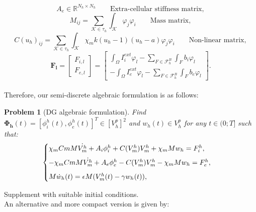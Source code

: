 \documentclass[a4paper,11pt]{article}
\newtheorem{problem}{Problem}
\begin{document}
\begin{equation*}
A_e \in \mathbb{R}^{N_h \times N_h} \qquad{\text{Extra-cellular stiffness matrix}},
\end{equation*}
\begin{equation*}
M_{ij} = \sum_{\mathcal{K} \in \tau_h}\int_{\mathcal{K}}\varphi_j\varphi_i \qquad{\text{Mass matrix}},
\end{equation*}
\begin{equation*}
C(u_h)_{ij} =  \sum_{\mathcal{K} \in \tau_h} \int_{\mathcal{K}} \chi_m k(u_h-1)(u_h-a)\varphi_j\varphi_i \qquad{\text{Non-linear matrix}},
\end{equation*}
\begin{equation*}
\bm{F_l}=\begin{bmatrix} F_{i,l} \\ F_{e,l} \end{bmatrix}=\begin{bmatrix} \int_{\Omega} I_i^{ext}\varphi_l - \sum_{F \in \mathcal{F}_h^B} \int_F b_i\varphi_l \\ - \int_{\Omega} I_e^{ext}\varphi_l - \sum_{F \in \mathcal{F}_h^B} \int_F b_e\varphi_l \end{bmatrix}.
\end{equation*}
\vspace{3mm} \\
Therefore, our semi-discrete algebraic formulation is as follows: \vspace{3mm}
\begin{problem}[DG algebraic formulation]\label{algebraic}
Find $\bm{\Phi_h}(t)=[\phi_i^h(t),\phi_e^h(t)]^T \in [V_h^p]^2$ and $w_h(t) \in V_h^p$ for any $t \in (0;T]$ such that:
\begin{equation*}
\begin{cases}
\chi_m Cm M \dot{V_m^h}+A_i \phi_i^h+C(V_m^h) V_m^h+\chi_m M w_h=F_i^h, \vspace{2mm} \\ 
-\chi_m Cm M \dot{V_m^h}+A_e \phi_e^h-C(V_m^h) V_m^h-\chi_m M w_h=F_e^h, \vspace{2mm} \\ 
M \dot{w}_h(t)=\epsilon M (V_m^h(t)-\gamma w_h(t)),
\end{cases}
\end{equation*}
\end{problem}
 \vspace{5mm}
 \noindent Supplement with suitable initial conditions.\\
 \noindent An alternative and more compact version is given by: \vspace{3mm}
\end{document}
